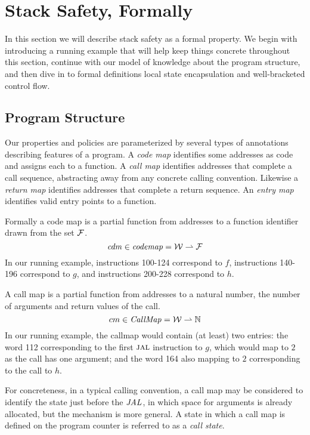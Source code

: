 \documentclass[acmsmall,review,anonymous]{acmart}\settopmatter{printfolios=true,printccs=false,printacmref=false}
\begin{document}
\section{Stack Safety, Formally}
\label{sec:lse-and-wbcf}

In this section we will describe stack safety as a formal property. We
begin with introducing a running example that will help keep things
concrete throughout this section, continue with our model of
 knowledge about the program structure, and
then dive in to formal definitions local state encapsulation and
well-bracketed control flow.




\subsection{Program Structure}

Our properties and policies are parameterized by several types of
annotations describing features of a program. A {\em code map}
identifies some addresses as code and assigns each to a function. A
{\em call map} identifies addresses that complete a call sequence,
abstracting away from any concrete calling convention. Likewise a {\em
  return map} identifies addresses that complete a return sequence. An
{\em entry map} identifies valid entry points to a function.

Formally a code map is a
partial function from addresses to a function
identifier drawn from the set \(\mathcal{F}\).
\[\mathit{cdm} \in \mathit{codemap} = {\mathcal W} \rightharpoonup \mathcal{F}\]
%
In our running example, instructions 100-124 correspond to $f$,
instructions 140-196 correspond to $g$, and instructions 200-228
correspond to $h$.

A call map is a partial function from addresses to a natural number,
the number of arguments and return values of the call.
\[cm \in \mathit{CallMap} = {\mathcal W} \rightharpoonup \mathbb{N}\]
%
In our running example, the callmap would contain (at least) two
entries: the word 112 corresponding to the first $\textsc{jal}$
instruction to $g$, which would map to $2$ as the call has one
argument; and the word 164 also mapping to $2$ corresponding
to the call to $h$.

For concreteness, in a typical calling convention, a call map may be
considered to identify the state just before the \(\mathit{JAL}\), in which
space for arguments is already allocated, but the mechanism is more
general. A state in which a call map is defined on the program counter
is referred to as a {\it call state}.
\end{document}
